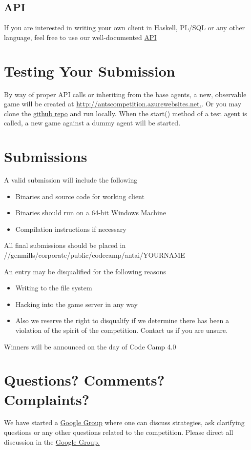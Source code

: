 \documentclass{article}
\begin{document}
\subsection{API}
If you are interested in writing your own client in Haskell, PL/SQL or any other language, feel free to use our well-documented \href{http://antscompetition.azurewebsites.net/Help}{API}

\section{Testing Your Submission}

By way of proper API calls or inheriting from the base agents, a new, observable game will be created at \url{http://antscompetition.azurewebsites.net.}. Or you may clone the \href{https://github.com/eonarheim/AntAICompetition}{github repo} and run locally.
\newline
\newline
When the start() method of a test agent is called, a new game against a dummy agent will be started. 

\section{Submissions}
A valid submission will include the following
\begin{itemize}
  \item Binaries and source code for working client
  \item Binaries should run on a 64-bit Windows Machine
  \item Compilation instructions if necessary
\end{itemize}


\noindent All final submissions should be placed in //genmills/corporate/public/codecamp/antai/YOURNAME
\newline
\newline

\noindent An entry may be disqualified for the following reasons
\begin{itemize}
  \item Writing to the file system
  \item Hacking into the game server in any way
  \item  Also we reserve the right to disqualify if we determine there has been a violation of the spirit of the competition. Contact us if you are unsure.
\end{itemize}

\noindent Winners will be announced on the day of Code Camp 4.0

\section{Questions? Comments? Complaints?}

We have started a \href{https://groups.google.com/forum/#!forum/gmi-ant-ai-challenge}{Google Group} where one can discuss strategies, ask clarifying questions or any other questions related to the competition. Please direct all discussion in the \href{https://groups.google.com/forum/#!forum/gmi-ant-ai-challenge}{Google Group.}
\end{document}

